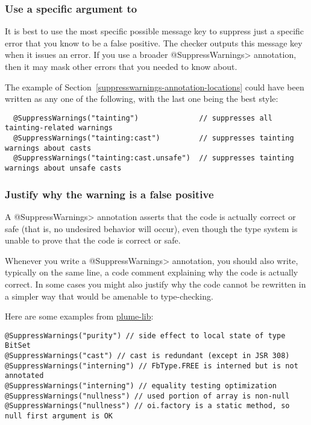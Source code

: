 \subsubsection{Use a specific argument to \label{suppresswarnings-best-practices-specific-argument}}


\label{compiler-message-keys}

It is best to use the most specific possible message key to suppress just a
specific error that you know to be a false positive.  The checker outputs
this message key when it issues an error.  If you use a broader
\<@SuppressWarnings> annotation, then it may mask other errors that you
needed to know about.

The example of Section~\ref{suppresswarnings-annotation-locations} could
have been written as any one of the following, with the last one being the
best style:

\begin{Verbatim}
  @SuppressWarnings("tainting")              // suppresses all tainting-related warnings
  @SuppressWarnings("tainting:cast")         // suppresses tainting warnings about casts
  @SuppressWarnings("tainting:cast.unsafe")  // suppresses tainting warnings about unsafe casts
\end{Verbatim}


\subsubsection{Justify why the warning is a false positive\label{suppresswarnings-best-practices-justification}}

A \<@SuppressWarnings> annotation asserts that the code is actually
correct or safe (that is, no undesired behavior will occur), even though
the type system is unable to prove that the code is correct or safe.

Whenever you write a \<@SuppressWarnings> annotation, you should also
write, typically on the same line, a code comment
explaining why the code is actually correct.  In some cases you might also
justify why the code cannot be rewritten in a simpler way that would be
amenable to type-checking.

Here are some examples from \href{https://mernst.github.io/plume-lib/}{plume-lib}:

\begin{Verbatim}
@SuppressWarnings("purity") // side effect to local state of type BitSet
@SuppressWarnings("cast") // cast is redundant (except in JSR 308)
@SuppressWarnings("interning") // FbType.FREE is interned but is not annotated
@SuppressWarnings("interning") // equality testing optimization
@SuppressWarnings("nullness") // used portion of array is non-null
@SuppressWarnings("nullness") // oi.factory is a static method, so null first argument is OK
\end{Verbatim}

